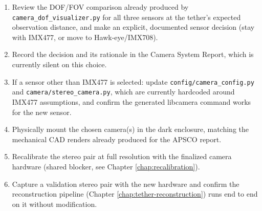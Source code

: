 \begin{enumerate}[leftmargin=*]
    \item Review the DOF/FOV comparison already produced by \texttt{camera\_dof\_visualizer.py} for all three sensors at the tether's expected observation distance, and make an explicit, documented sensor decision (stay with IMX477, or move to Hawk-eye/IMX708).
    \item Record the decision and its rationale in the Camera System Report, which is currently silent on this choice.
    \item If a sensor other than IMX477 is selected: update \texttt{config/camera\_config.py} and \texttt{camera/stereo\_camera.py}, which are currently hardcoded around IMX477 assumptions, and confirm the generated libcamera command works for the new sensor.
    \item Physically mount the chosen camera(s) in the dark enclosure, matching the mechanical CAD renders already produced for the APSCO report.
    \item Recalibrate the stereo pair at full resolution with the finalized camera hardware (shared blocker, see Chapter \ref{chap:recalibration}).
    \item Capture a validation stereo pair with the new hardware and confirm the reconstruction pipeline (Chapter \ref{chap:tether-reconstruction}) runs end to end on it without modification.
\end{enumerate}
